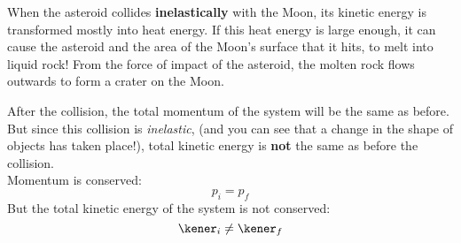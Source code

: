 When the asteroid collides \textbf{inelastically} with the Moon, its kinetic energy is transformed mostly into heat energy. If this heat energy is large enough, it can cause the asteroid and the area of the Moon's surface that it hits, to melt into liquid rock! From the force of impact of the asteroid, the molten rock flows outwards to form a crater on the Moon.

After the collision, the total momentum of the system will be the same as before. But since this collision is \emph{inelastic}, (and you can see that a change in the shape of objects has taken place!), total kinetic energy is \textbf{not} the same as before the collision.\\
Momentum is conserved:
\begin{equation*}
p_{i} = p_{f}
\end{equation*}
But the total kinetic energy of the system is not conserved:
\begin{equation*}
\kener_{i} \neq \kener_{f}
\end{equation*}

